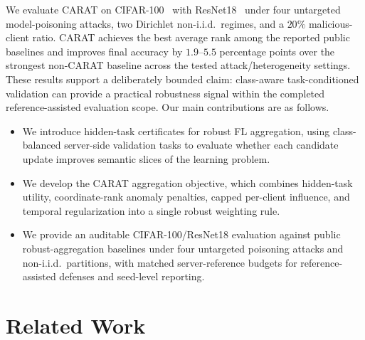 \documentclass{article}
\begin{document}
We evaluate CARAT on CIFAR-100~\citep{krizhevsky2009learning} with ResNet18~\citep{he2016deep} under four untargeted model-poisoning attacks, two Dirichlet non-i.i.d.\ regimes, and a $20\%$ malicious-client ratio. CARAT achieves the best average rank among the reported public baselines and improves final accuracy by $1.9$--$5.5$ percentage points over the strongest non-CARAT baseline across the tested attack/heterogeneity settings. These results support a deliberately bounded claim: class-aware task-conditioned validation can provide a practical robustness signal within the completed reference-assisted evaluation scope. Our main contributions are as follows.

\begin{itemize}
\item We introduce hidden-task certificates for robust FL aggregation, using class-balanced server-side validation tasks to evaluate whether each candidate update improves semantic slices of the learning problem.
\item We develop the CARAT aggregation objective, which combines hidden-task utility, coordinate-rank anomaly penalties, capped per-client influence, and temporal regularization into a single robust weighting rule.
\item We provide an auditable CIFAR-100/ResNet18 evaluation against public robust-aggregation baselines under four untargeted poisoning attacks and non-i.i.d.\ partitions, with matched server-reference budgets for reference-assisted defenses and seed-level reporting.
\end{itemize}

\section{Related Work}
\label{sec:related-work}
\end{document}
